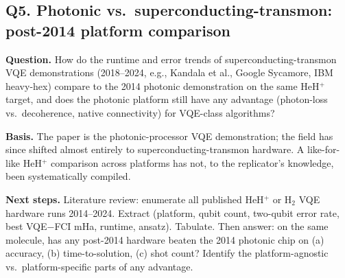 \subsection*{Q5. Photonic vs.\ superconducting-transmon: post-2014 platform comparison}
\textbf{Question.} How do the runtime and error trends of superconducting-transmon VQE demonstrations (2018--2024, e.g., Kandala et al., Google Sycamore, IBM heavy-hex) compare to the 2014 photonic demonstration on the same HeH$^+$ target, and does the photonic platform still have any advantage (photon-loss vs.\ decoherence, native connectivity) for VQE-class algorithms?

\textbf{Basis.} The paper is the photonic-processor VQE demonstration; the field has since shifted almost entirely to superconducting-transmon hardware. A like-for-like HeH$^+$ comparison across platforms has not, to the replicator's knowledge, been systematically compiled.

\textbf{Next steps.} Literature review: enumerate all published HeH$^+$ or H$_2$ VQE hardware runs 2014--2024. Extract (platform, qubit count, two-qubit error rate, best VQE$-$FCI mHa, runtime, ansatz). Tabulate. Then answer: on the same molecule, has any post-2014 hardware beaten the 2014 photonic chip on (a) accuracy, (b) time-to-solution, (c) shot count? Identify the platform-agnostic vs.\ platform-specific parts of any advantage.
